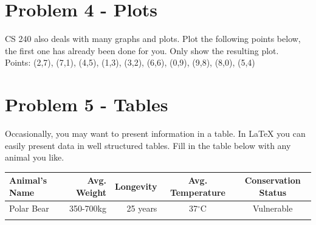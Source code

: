 \documentclass[12pt]{article}
\begin{document}
\clearpage


\section*{Problem 4 - Plots}

CS 240 also deals with many graphs and plots. Plot the following points below, the first one has already been done for you. Only show the resulting plot.\\
Points: (2,7), (7,1), (4,5), (1,3), (3,2), (6,6), (0,9), (9,8), (8,0), (5,4)

\begin{center}
\end{center}

\section*{Problem 5 - Tables}
Occasionally, you may want to present information in a table. In \LaTeX{} you can easily
 present data in well structured tables. 
Fill in the table below with any animal you like.\\

 

\begin{tabular}{ | l || r  | r | c | c |} \hline
  Animal's Name & Avg. Weight & Longevity & Avg. Temperature & Conservation Status  \\ \hline
   Polar Bear & 350-700kg & 25 years & 37$^{\circ}$C  & Vulnerable \\ \hline
    & & & & \\ \hline
\end{tabular}
\end{document}
